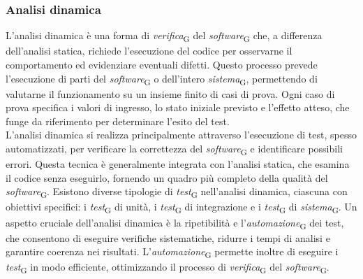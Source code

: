 \subsubsection{Analisi dinamica}
L'analisi dinamica è una forma di \textit{verifica}\textsubscript{G} del \textit{software}\textsubscript{G} che, a differenza dell'analisi statica, richiede l'esecuzione del codice per osservarne il comportamento ed evidenziare eventuali difetti. Questo processo prevede l'esecuzione di parti del \textit{software}\textsubscript{G} o dell'intero \textit{sistema}\textsubscript{G}, permettendo di valutarne il funzionamento su un insieme finito di casi di prova. Ogni caso di prova specifica i valori di ingresso, lo stato iniziale previsto e l'effetto atteso, che funge da riferimento per determinare l'esito del test. \\
L'analisi dinamica si realizza principalmente attraverso l'esecuzione di test, spesso automatizzati, per verificare la correttezza del \textit{software}\textsubscript{G} e identificare possibili errori. Questa tecnica è generalmente integrata con l'analisi statica, che esamina il codice senza eseguirlo, fornendo un quadro più completo della qualità del \textit{software}\textsubscript{G}. Esistono diverse tipologie di \textit{test}\textsubscript{G} nell'analisi dinamica, ciascuna con obiettivi specifici: i \textit{test}\textsubscript{G} di unità, i \textit{test}\textsubscript{G} di integrazione e i \textit{test}\textsubscript{G} di \textit{sistema}\textsubscript{G}. Un aspetto cruciale dell'analisi dinamica è la ripetibilità e l'\textit{automazione}\textsubscript{G} dei test, che consentono di eseguire verifiche sistematiche, ridurre i tempi di analisi e garantire coerenza nei risultati. L'\textit{automazione}\textsubscript{G} permette inoltre di eseguire i \textit{test}\textsubscript{G} in modo efficiente, ottimizzando il processo di \textit{verifica}\textsubscript{G} del \textit{software}\textsubscript{G}.